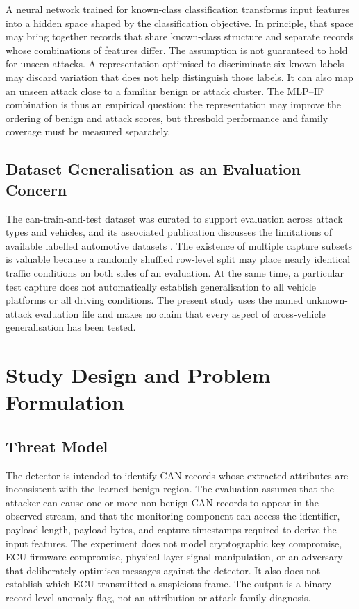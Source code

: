 \documentclass[journal]{IEEEtran}
\begin{document}
A neural network trained for known-class classification transforms input features into a hidden space shaped by the classification objective. In principle, that space may bring together records that share known-class structure and separate records whose combinations of features differ. The assumption is not guaranteed to hold for unseen attacks. A representation optimised to discriminate six known labels may discard variation that does not help distinguish those labels. It can also map an unseen attack close to a familiar benign or attack cluster. The MLP--IF combination is thus an empirical question: the representation may improve the ordering of benign and attack scores, but threshold performance and family coverage must be measured separately.

\subsection{Dataset Generalisation as an Evaluation Concern}
The can-train-and-test dataset was curated to support evaluation across attack types and vehicles, and its associated publication discusses the limitations of available labelled automotive datasets \cite{lampe2024dataset}. The existence of multiple capture subsets is valuable because a randomly shuffled row-level split may place nearly identical traffic conditions on both sides of an evaluation. At the same time, a particular test capture does not automatically establish generalisation to all vehicle platforms or all driving conditions. The present study uses the named unknown-attack evaluation file and makes no claim that every aspect of cross-vehicle generalisation has been tested.

\section{Study Design and Problem Formulation}
\subsection{Threat Model}
The detector is intended to identify CAN records whose extracted attributes are inconsistent with the learned benign region. The evaluation assumes that the attacker can cause one or more non-benign CAN records to appear in the observed stream, and that the monitoring component can access the identifier, payload length, payload bytes, and capture timestamps required to derive the input features. The experiment does not model cryptographic key compromise, ECU firmware compromise, physical-layer signal manipulation, or an adversary that deliberately optimises messages against the detector. It also does not establish which ECU transmitted a suspicious frame. The output is a binary record-level anomaly flag, not an attribution or attack-family diagnosis.
\end{document}
